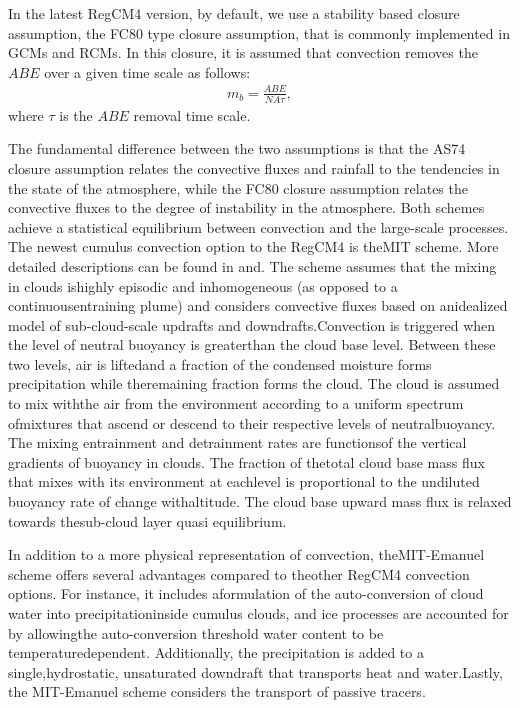 In the latest RegCM4 version, by default, we use a stability based closure
assumption, the FC80 type closure assumption, that is commonly implemented in
GCMs and RCMs. In this closure, it is assumed that convection removes the $ABE$
over a given time scale as follows: \begin{eqnarray} m_b=\frac{ABE}{NA \tau},
\label{eqn_model:closureFC} \end{eqnarray} where $\tau$ is the $ABE$ removal
time scale.

The fundamental difference between the two assumptions is that the AS74 closure
assumption relates the convective fluxes and rainfall to the tendencies in the
state of the atmosphere, while the FC80 closure assumption relates the
convective fluxes to the degree of instability in the atmosphere. Both schemes
achieve a statistical equilibrium between convection and the large-scale
processes.  \\


 The newest cumulus convection option to
the \ac{RegCM4} is the\ac{MIT} scheme. More detailed descriptions can be found
in \citet{Emanuel_91} and\citet{Emanuel_99}.  The scheme assumes that the
mixing in clouds ishighly episodic and inhomogeneous (as opposed to a
continuousentraining plume) and considers convective fluxes based on
anidealized model of sub-cloud-scale updrafts and downdrafts.Convection is
triggered when the level of neutral buoyancy is greaterthan the cloud base
level.  Between these two levels, air is liftedand a fraction of the condensed
moisture forms precipitation while theremaining fraction forms the cloud.  The
cloud is assumed to mix withthe air from the environment according to a
uniform spectrum ofmixtures that ascend or descend to their respective levels
of neutralbuoyancy.  The mixing entrainment and detrainment rates are
functionsof the vertical gradients of buoyancy in clouds.  The fraction of
thetotal cloud base mass flux that mixes with its environment at eachlevel
is proportional to the undiluted buoyancy rate of change withaltitude.  The
cloud base upward mass flux is relaxed towards thesub-cloud layer quasi
equilibrium.

In addition to a more physical representation of convection, theMIT-Emanuel
scheme offers several advantages compared to theother RegCM4 convection
options.  For instance, it includes aformulation of the auto-conversion of
cloud water into precipitationinside cumulus clouds, and ice processes are
accounted for by allowingthe auto-conversion threshold water content to be
temperaturedependent.  Additionally, the precipitation is added to a
single,hydrostatic, unsaturated downdraft that transports heat and
water.Lastly, the MIT-Emanuel scheme considers the transport of passive
tracers.

